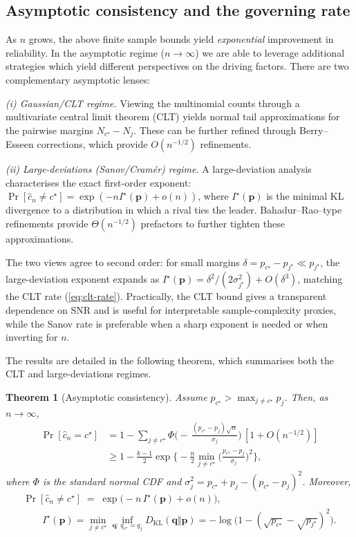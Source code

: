 \documentclass{article} %
\newtheorem{theorem}{Theorem}[section]
\begin{document}
\subsection{Asymptotic consistency and the governing rate}
\label{subsec:asymptotics}

As $n$ grows, the above finite sample bounds yield \emph{exponential} improvement in reliability.   In the asymptotic regime ($n\rightarrow \infty$) we are able to leverage additional strategies which yield different perspectives on the driving factors.  There are two complementary asymptotic lenses:

\emph{(i) Gaussian/CLT regime.}
Viewing the multinomial counts through a multivariate central limit theorem (CLT) yields normal tail
approximations for the pairwise margins $N_{c^\star}-N_j$. These can be further refined through Berry–Esseen corrections, which provide $O(n^{-1/2})$ refinements. 

\emph{(ii) Large-deviations (Sanov/Cramér) regime.}
A large-deviation analysis \citep{dembo2010ldp} characterises the exact first-order exponent:
$\Pr[\widehat{c}_n\neq c^\star]=\exp(-n I^\star(\mathbf p)+o(n))$, where $I^\star(\mathbf p)$ is the
minimal KL divergence to a distribution in which a rival ties the leader. Bahadur–Rao–type refinements provide $\Theta(n^{-1/2})$ prefactors to further tighten these approximations.

The two views agree to second order: for small margins $\delta=p_{c^\star}-p_{j^\star}\ll p_{j^\star}$,
the large-deviation exponent expands as $I^\star(\mathbf p)=\delta^2/(2\sigma_{j^\star}^2)+O(\delta^3)$,
matching the CLT rate (\ref{eq:clt-rate}). Practically, the CLT bound gives a transparent dependence on SNR and is
useful for interpretable sample-complexity proxies, while the Sanov rate is preferable when a sharp
exponent is needed or when inverting for $n$.

The results are detailed in the following theorem, which summarises both the CLT and large-deviations regimes.

\begin{theorem}[Asymptotic consistency]\label{thm:majority_rates}
Assume $p_{c^\star}>\max_{j\neq c^\star}p_j$. Then, as $n\to\infty$,
\begin{align}
\Pr[\widehat{c}_n=c^\star]
&= 1 - \sum_{j\neq c^\star}\Phi\!\Big(-\,\tfrac{(p_{c^\star}-p_j)\sqrt n}{\sigma_j}\Big)\,[1+O(n^{-1/2})]
\nonumber\\[-1mm]
&\ge 1 - \frac{k-1}{2}\exp\!\Big\{-\frac{n}{2}\min_{j\neq c^\star}\Big(\tfrac{p_{c^\star}-p_j}{\sigma_j}\Big)^2\Big\},\label{eq:clt-rate}
\end{align}
where $\Phi$ is the standard normal CDF and $\sigma_j^2=p_{c^\star}+p_j-(p_{c^\star}-p_j)^2$.
Moreover,
\begin{gather*}
\Pr[\widehat{c}_n\neq c^\star] \;=\; \exp\big(-n\,I^\star(\mathbf p)+o(n)\big),\\
\qquad
I^\star(\mathbf p)
= \min_{j\neq c^\star}\inf_{\mathbf q:\,q_{c^\star}=q_j}D_{\mathrm{KL}}(\mathbf q\Vert \mathbf p)
= -\log\!\Big(1-(\sqrt{p_{c^\star}}-\sqrt{p_{j^\star}})^2\Big).
\end{gather*}
\end{theorem}
\end{document}
